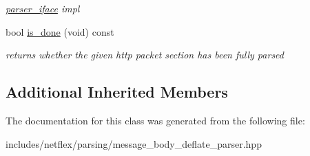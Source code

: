 \begin{DoxyCompactItemize}
\begin{DoxyCompactList}\small\item\em \hyperlink{classnetflex_1_1parsing_1_1parser__iface}{parser\+\_\+iface} impl \end{DoxyCompactList}\item 
\mbox{\label{classnetflex_1_1parsing_1_1message__body__deflate__parser_a2e80b1cc5a930497653e200c72adc4e5}} 
bool \hyperlink{classnetflex_1_1parsing_1_1message__body__deflate__parser_a2e80b1cc5a930497653e200c72adc4e5}{is\+\_\+done} (void) const
\begin{DoxyCompactList}\small\item\em returns whether the given http packet section has been fully parsed \end{DoxyCompactList}\end{DoxyCompactItemize}
\subsection*{Additional Inherited Members}


The documentation for this class was generated from the following file\+:\begin{DoxyCompactItemize}
\item 
includes/netflex/parsing/message\+\_\+body\+\_\+deflate\+\_\+parser.\+hpp\end{DoxyCompactItemize}
